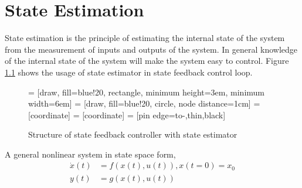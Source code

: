 \chapter{State Estimation}
\label{ch:st_est}
State estimation is the principle of estimating the internal state of the system from the measurement of inputs and outputs of the system. In general knowledge of the internal state of the system will make the system easy to control. Figure \ref{fig:observer} shows the usage of state estimator in state feedback control loop.
\begin{figure}[h]
 = [draw, fill=blue!20, rectangle, 
    minimum height=3em, minimum width=6em]
 = [draw, fill=blue!20, circle, node distance=1cm]
 = [coordinate]
 = [coordinate]
 = [pin edge={to-,thin,black}]
\def\blockdist{2.3}
    \caption{Structure of state feedback controller with state estimator}
      \label{fig:observer}
\end{figure}

A general nonlinear system in state space form,
\begin{equation}
\begin{split}
\label{eqn:nl_sys}
\dot{x}(t) &= f(x(t),u(t)) , x(t=0) = x_0 \\
y(t) &= g(x(t),u(t))
\end{split}
\end{equation}

